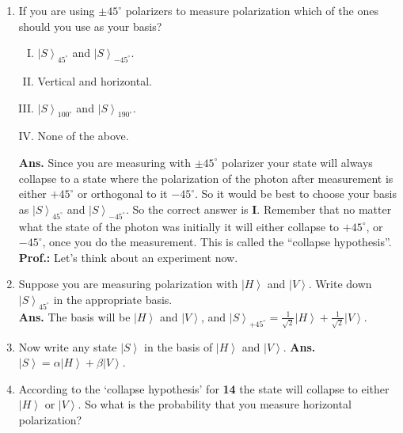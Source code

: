 \documentclass[12pt]{article}
\newcommand\rr{\right \rangle}
\newcommand\ls{\left |}
\newcommand\tbf[1]{\textbf{#1}}
\newcommand\tp{\tbf{Prof.: }}
\begin{document}
\begin{enumerate}[1.]
\tp Then next question is which one should we choose? Well, we will choose the one that is most convenient for our measurement. For example, if we are using vertical and horizontal polarizers to measure the polarization states of a photon it would be best to choose $\ls V \rr$ and $\ls H \rr$ as our basis, $\ls S \rr = \alpha \ls V \rr + \beta \ls H \rr$. \newline
\item If you are using $\pm 45^\circ$ polarizers to measure polarization which of the ones should you use as your basis?
\begin{enumerate}[I.]
\item $\ls S \rr _{45^\circ}$ and $\ls S \rr _{-45^\circ}$.
\item Vertical and horizontal.
\item $\ls S \rr _{100^\circ}$ and $\ls S \rr _{190^\circ}$.
\item None of the above. \newline
\end{enumerate}
\tbf{Ans.} Since you are measuring with $\pm 45^\circ$ polarizer your state will always collapse to a state where the polarization of the photon after measurement is either $+45^\circ$ or orthogonal to it $-45^\circ$. So it would be best to choose your basis as $\ls S \rr _{45^\circ}$ and $\ls S \rr _{-45^\circ}$. So the correct answer is \tbf{I}. Remember that no matter what the state of the photon was initially it will either collapse to $+45^\circ$, or $-45^\circ$, once you do the measurement. This is called the ``collapse hypothesis''. \newline
\tp Let's think about an experiment now.
\item Suppose you are measuring polarization with $\ls H \rr$ and $\ls V \rr$. Write down $\ls S \rr_{45^\circ}$ in the appropriate basis. \\ \newline
\tbf{Ans.} The basis will be $\ls H \rr$ and $\ls V \rr$, and $\ls S \rr _{+45^\circ} = \frac{1}{\sqrt{2}}\ls H \rr + \frac{1}{\sqrt{2}} \ls V \rr$.
\item Now write any state $\ls S \rr$ in the basis of $\ls H \rr$ and $\ls V \rr$. \newline
\tbf{Ans.} $\ls S \rr = \alpha \ls H \rr + \beta \ls V \rr$.
\item According to the `collapse hypothesis' for \tbf{14} the state will collapse to either $\ls H \rr$ or $\ls V \rr$. So what is the probability that you measure horizontal polarization? \newline

\end{enumerate}
\end{document}
